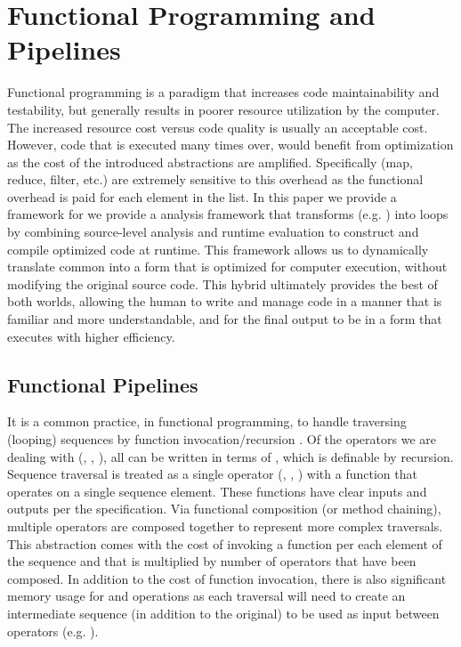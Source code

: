\section{Functional Programming and Pipelines}
Functional programming is a paradigm that increases code maintainability and testability, but generally results in poorer resource utilization by the computer.  The increased resource cost versus code quality is usually an acceptable cost. However, code that is executed many times over, would benefit from optimization as the cost of the introduced abstractions are amplified. Specifically \pipelines (map, reduce, filter, etc.) are extremely sensitive to this overhead as the functional overhead is paid for each element in the list. In this paper we provide a framework for we provide a \javascript analysis framework that transforms \pipelines (e.g. ) into  loops by combining source-level analysis and runtime evaluation to construct and compile optimized code at runtime.  This framework allows us to dynamically translate common \pipelines into a form that is optimized for computer execution, without modifying the original source code. This hybrid ultimately provides the best of both worlds, allowing the human to write and manage code in a manner that is familiar and more understandable, and for the final output to be in a form that executes with higher efficiency.

\subsection{Functional Pipelines}
It is a common practice, in functional programming, to handle traversing (looping) sequences by function invocation/recursion \cite{recurse16}.  Of the operators we are dealing with (, , ), all can be written in terms of , which is definable by recursion. Sequence traversal is treated as a single operator (, , ) with a function that operates on a single sequence element. These functions have clear inputs and outputs per the \javascript specification.  Via functional composition (or method chaining), multiple operators are composed together to represent more complex traversals.  This abstraction comes with the cost of invoking a function per each element of the sequence and that is multiplied by number of operators that have been composed. In addition to the cost of function invocation, there is also significant memory usage for  and  operations as each traversal will need to create an intermediate sequence (in addition to the original) to be used as input between operators (e.g. ).  

